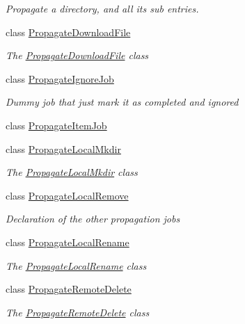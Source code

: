\begin{DoxyCompactItemize}
\begin{DoxyCompactList}\small\item\em Propagate a directory, and all its sub entries. \end{DoxyCompactList}\item 
class \hyperlink{class_o_c_c_1_1_propagate_download_file}{Propagate\+Download\+File}
\begin{DoxyCompactList}\small\item\em The \hyperlink{class_o_c_c_1_1_propagate_download_file}{Propagate\+Download\+File} class \end{DoxyCompactList}\item 
class \hyperlink{class_o_c_c_1_1_propagate_ignore_job}{Propagate\+Ignore\+Job}
\begin{DoxyCompactList}\small\item\em Dummy job that just mark it as completed and ignored \end{DoxyCompactList}\item 
class \hyperlink{class_o_c_c_1_1_propagate_item_job}{Propagate\+Item\+Job}
\item 
class \hyperlink{class_o_c_c_1_1_propagate_local_mkdir}{Propagate\+Local\+Mkdir}
\begin{DoxyCompactList}\small\item\em The \hyperlink{class_o_c_c_1_1_propagate_local_mkdir}{Propagate\+Local\+Mkdir} class \end{DoxyCompactList}\item 
class \hyperlink{class_o_c_c_1_1_propagate_local_remove}{Propagate\+Local\+Remove}
\begin{DoxyCompactList}\small\item\em Declaration of the other propagation jobs \end{DoxyCompactList}\item 
class \hyperlink{class_o_c_c_1_1_propagate_local_rename}{Propagate\+Local\+Rename}
\begin{DoxyCompactList}\small\item\em The \hyperlink{class_o_c_c_1_1_propagate_local_rename}{Propagate\+Local\+Rename} class \end{DoxyCompactList}\item 
class \hyperlink{class_o_c_c_1_1_propagate_remote_delete}{Propagate\+Remote\+Delete}
\begin{DoxyCompactList}\small\item\em The \hyperlink{class_o_c_c_1_1_propagate_remote_delete}{Propagate\+Remote\+Delete} class \end{DoxyCompactList}\item 

\end{DoxyCompactItemize}
